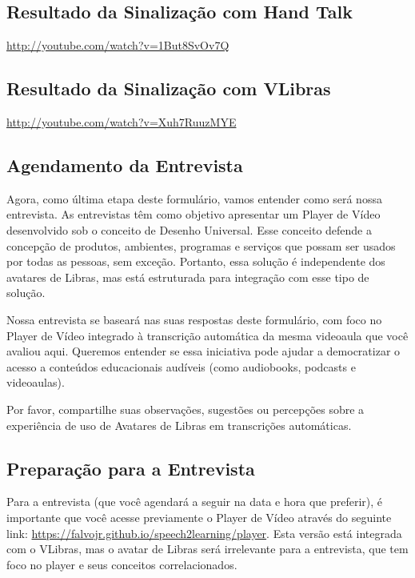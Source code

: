 \subsection{Resultado da Sinalização com Hand Talk}

\url{http://youtube.com/watch?v=1But8SvOv7Q}

\subsection{Resultado da Sinalização com VLibras}

\url{http://youtube.com/watch?v=Xuh7RuuzMYE}

\subsection{Agendamento da Entrevista}

Agora, como última etapa deste formulário, vamos entender como será nossa 
entrevista. As entrevistas têm como objetivo apresentar um Player de Vídeo 
desenvolvido sob o conceito de Desenho Universal. Esse conceito defende a concepção 
de produtos, ambientes, programas e serviços que possam ser usados por todas as 
pessoas, sem exceção. Portanto, essa solução é independente dos avatares de Libras, 
mas está estruturada para integração com esse tipo de solução.

Nossa entrevista se baseará nas suas respostas deste formulário, com foco no Player de 
Vídeo integrado à transcrição automática da mesma videoaula que você avaliou aqui. 
Queremos entender se essa iniciativa pode ajudar a democratizar o acesso a conteúdos 
educacionais audíveis (como audiobooks, podcasts e videoaulas).

Por favor, compartilhe suas observações, sugestões ou percepções sobre
a experiência de uso de Avatares de Libras em transcrições automáticas.

\subsection{Preparação para a Entrevista}

Para a entrevista (que você agendará a seguir na data e hora que preferir), é importante que 
você acesse previamente o Player de Vídeo através do seguinte 
link: \url{https://falvojr.github.io/speech2learning/player}. Esta versão está integrada com o 
VLibras, mas o avatar de Libras será irrelevante para a entrevista, que tem foco no player e 
seus conceitos correlacionados.

